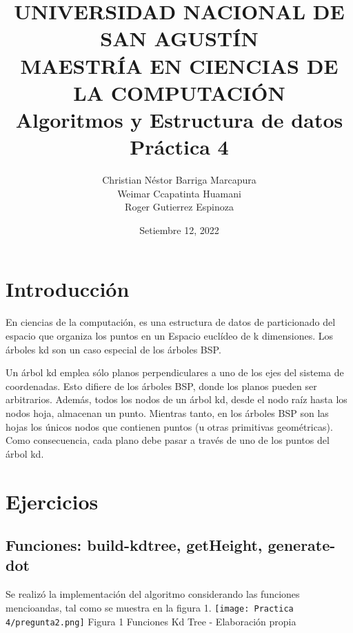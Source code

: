 \documentclass{article}
\title{UNIVERSIDAD NACIONAL DE SAN AGUSTÍN\\
MAESTRÍA EN CIENCIAS DE LA COMPUTACIÓN\\
Algoritmos y Estructura de datos\\Práctica 4}
\author{Christian Néstor Barriga Marcapura\\
        Weimar Ccapatinta Huamani\\ Roger Gutierrez Espinoza}
\date{Setiembre 12, 2022}
\begin{document}
\maketitle

\tableofcontents
\newpage
\pagestyle{fancy}
\fancyhf{}
\rfoot{\thepage}{}
\section{Introducción}
\doublespacing En ciencias de la computación, es una estructura de datos de particionado del espacio que organiza los puntos en un Espacio euclídeo de k dimensiones. Los árboles kd son un caso especial de los árboles BSP.

Un árbol kd emplea sólo planos perpendiculares a uno de los ejes del sistema de coordenadas. Esto difiere de los árboles BSP, donde los planos pueden ser arbitrarios. Además, todos los nodos de un árbol kd, desde el nodo raíz hasta los nodos hoja, almacenan un punto. Mientras tanto, en los árboles BSP son las hojas los únicos nodos que contienen puntos (u otras primitivas geométricas). Como consecuencia, cada plano debe pasar a través de uno de los puntos del árbol kd.

\section{Ejercicios}
\doublespacing 
\subsection{Funciones: build-kdtree, getHeight, generate-dot}
Se realizó la implementación del algoritmo considerando las funciones mencioandas, tal como se muestra en la figura 1.
 \center\texttt{[image: Practica 4/pregunta2.png]}
 \center Figura 1 Funciones Kd Tree - Elaboración propia
 
\newpage\
 
\end{document}
